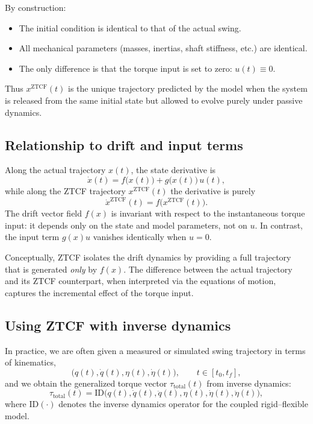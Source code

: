 \documentclass[12pt]{article}
\newcommand{\qd}{\dot{q}}
\newcommand{\qdd}{\ddot{q}}
\newcommand{\etad}{\dot{\eta}}
\newcommand{\etadd}{\ddot{\eta}}
\begin{document}
By construction:
\begin{itemize}
  \item The initial condition is identical to that of the actual swing.
  \item All mechanical parameters (masses, inertias, shaft stiffness, etc.) are identical.
  \item The only difference is that the torque input is set to zero: \(u(t) \equiv 0\).
\end{itemize}
Thus \(x^{\mathrm{ZTCF}}(t)\) is the unique trajectory predicted by the model when the system is released from the same initial state but allowed to evolve purely under passive dynamics.

\subsection{Relationship to drift and input terms}

Along the actual trajectory \(x(t)\), the state derivative is
\begin{equation}
  \dot{x}(t) = f\big(x(t)\big) + g\big(x(t)\big)\,u(t),
\end{equation}
while along the ZTCF trajectory \(x^{\mathrm{ZTCF}}(t)\) the derivative is purely
\begin{equation}
  \dot{x}^{\mathrm{ZTCF}}(t) = f\big(x^{\mathrm{ZTCF}}(t)\big).
\end{equation}
The drift vector field \(f(x)\) is invariant with respect to the instantaneous torque input: it depends only on the state and model parameters, not on \(u\). In contrast, the input term \(g(x)u\) vanishes identically when \(u = 0\).

Conceptually, ZTCF isolates the drift dynamics by providing a full trajectory that is generated \emph{only} by \(f(x)\). The difference between the actual trajectory and its ZTCF counterpart, when interpreted via the equations of motion, captures the incremental effect of the torque input.

\subsection{Using ZTCF with inverse dynamics}

In practice, we are often given a measured or simulated swing trajectory in terms of kinematics,
\begin{equation}
  \big(q(t), \qd(t), \eta(t), \etad(t)\big), \qquad t \in [t_{0}, t_{f}],
\end{equation}
and we obtain the generalized torque vector \(\tau_{\text{total}}(t)\) from inverse dynamics:
\begin{equation}
  \tau_{\text{total}}(t) = \text{ID}\big(q(t), \qd(t), \qdd(t), \eta(t), \etad(t), \etadd(t)\big),
\end{equation}
where \(\text{ID}(\cdot)\) denotes the inverse dynamics operator for the coupled rigid--flexible model.
\end{document}
